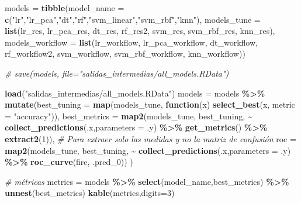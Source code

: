\documentclass[12pt,a4paper,]{book}
\newenvironment{Shaded}{\begin{snugshade}}{\end{snugshade}}
\newcommand{\AttributeTok}[1]{\textcolor[rgb]{0.13,0.29,0.53}{#1}}
\newcommand{\CommentTok}[1]{\textcolor[rgb]{0.56,0.35,0.01}{\textit{#1}}}
\newcommand{\ControlFlowTok}[1]{\textcolor[rgb]{0.13,0.29,0.53}{\textbf{#1}}}
\newcommand{\DecValTok}[1]{\textcolor[rgb]{0.00,0.00,0.81}{#1}}
\newcommand{\FunctionTok}[1]{\textcolor[rgb]{0.13,0.29,0.53}{\textbf{#1}}}
\newcommand{\NormalTok}[1]{#1}
\newcommand{\OtherTok}[1]{\textcolor[rgb]{0.56,0.35,0.01}{#1}}
\newcommand{\SpecialCharTok}[1]{\textcolor[rgb]{0.81,0.36,0.00}{\textbf{#1}}}
\newcommand{\StringTok}[1]{\textcolor[rgb]{0.31,0.60,0.02}{#1}}
\numberwithin{dummy}{section}
\theoremstyle{ocrenumbox}
\theoremstyle{blacknumex}
\theoremstyle{blacknumbox}
\theoremstyle{ocrenum}
\theoremstyle{ocrenum}
\begin{document}
\begin{Shaded}
\begin{Highlighting}[]
\NormalTok{models }\OtherTok{=} \FunctionTok{tibble}\NormalTok{(}\AttributeTok{model\_name =} \FunctionTok{c}\NormalTok{(}\StringTok{"lr"}\NormalTok{,}\StringTok{"lr\_pca"}\NormalTok{,}\StringTok{"dt"}\NormalTok{,}\StringTok{"rf"}\NormalTok{,}\StringTok{"svm\_linear"}\NormalTok{,}\StringTok{"svm\_rbf"}\NormalTok{,}\StringTok{"knn"}\NormalTok{),}
                \AttributeTok{models\_tune =} \FunctionTok{list}\NormalTok{(lr\_res, lr\_pca\_res, dt\_res, rf\_res2, svm\_res, svm\_rbf\_res, knn\_res),}
                \AttributeTok{models\_workflow =} \FunctionTok{list}\NormalTok{(lr\_workflow, lr\_pca\_workflow, dt\_workflow, rf\_workflow2, svm\_workflow, svm\_rbf\_workflow, knn\_workflow))}

\CommentTok{\# save(models, file="salidas\_intermedias/all\_models.RData")}

\FunctionTok{load}\NormalTok{(}\StringTok{"salidas\_intermedias/all\_models.RData"}\NormalTok{)}
\NormalTok{models }\OtherTok{=}\NormalTok{ models }\SpecialCharTok{\%\textgreater{}\%} 
  \FunctionTok{mutate}\NormalTok{(}\AttributeTok{best\_tuning =} \FunctionTok{map}\NormalTok{(models\_tune, }
                           \ControlFlowTok{function}\NormalTok{(x) }\FunctionTok{select\_best}\NormalTok{(x, }\AttributeTok{metric =} \StringTok{"accuracy"}\NormalTok{)),}
         \AttributeTok{best\_metrics =} \FunctionTok{map2}\NormalTok{(models\_tune,}
\NormalTok{                             best\_tuning,       }
                             \SpecialCharTok{\textasciitilde{}} \FunctionTok{collect\_predictions}\NormalTok{(.x,}\AttributeTok{parameters =}\NormalTok{ .y) }\SpecialCharTok{\%\textgreater{}\%}    
                               \FunctionTok{get\_metrics}\NormalTok{() }\SpecialCharTok{\%\textgreater{}\%}          
                               \FunctionTok{extract2}\NormalTok{(}\DecValTok{1}\NormalTok{)), }\CommentTok{\# Para extraer solo las medidas y no la matriz de confusión}
         \AttributeTok{roc =} \FunctionTok{map2}\NormalTok{(models\_tune,}
\NormalTok{                    best\_tuning,}
                    \SpecialCharTok{\textasciitilde{}} \FunctionTok{collect\_predictions}\NormalTok{(.x,}\AttributeTok{parameters =}\NormalTok{ .y) }\SpecialCharTok{\%\textgreater{}\%}    
                      \FunctionTok{roc\_curve}\NormalTok{(fire, .pred\_0))}
\NormalTok{) }

\CommentTok{\# métricas}
\NormalTok{metrics }\OtherTok{=}\NormalTok{ models }\SpecialCharTok{\%\textgreater{}\%} 
  \FunctionTok{select}\NormalTok{(model\_name,best\_metrics) }\SpecialCharTok{\%\textgreater{}\%} 
  \FunctionTok{unnest}\NormalTok{(best\_metrics)}
\FunctionTok{kable}\NormalTok{(metrics,}\AttributeTok{digits=}\DecValTok{3}\NormalTok{) }


\end{Highlighting}
\end{Shaded}
\end{document}
